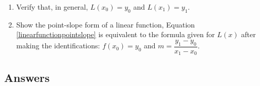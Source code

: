 \begin{enumerate}
\begin{enumerate}
\begin{multicols}{4}
\begin{enumerate}
\end{enumerate}

\end{multicols}

\item  Verify that, in general, $L(x_{0}) = y_{0}$ and $L(x_{1}) = y_{1}$. 

\item  Show the point-slope form of a linear function, Equation \ref{linearfunctionpointslope} is equivalent to the formula given for $L(x)$ after making the identifications:  $f(x_{0}) = y_{0}$ and $m = \dfrac{y_{1} - y_{0}}{x_{1} - x_{0}}$.

\end{enumerate}




\setcounter{HW}{\value{enumi}}
\end{enumerate}


\newpage

\subsection{Answers}


